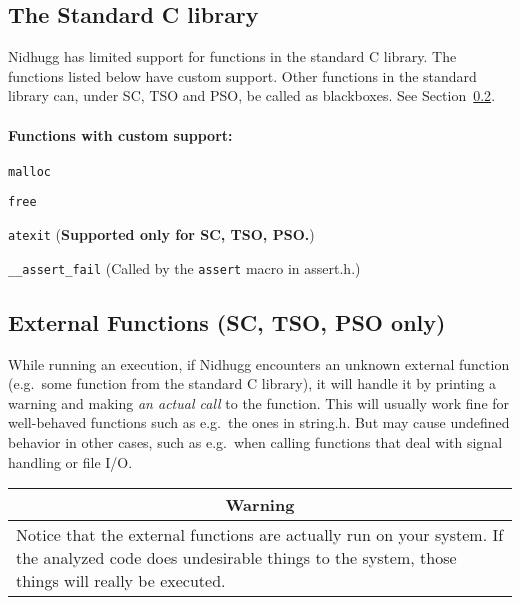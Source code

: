 \documentclass[a4paper]{article}
\newcommand{\limitsupport}[1]{\textbf{Supported only for #1.}}
\begin{document}
\subsection{The Standard C library}\label{sec:stdlibc}

Nidhugg has limited support for functions in the standard C
library. The functions listed below have custom support. Other
functions in the standard library can, under SC, TSO and PSO, be
called as blackboxes. See Section~\ref{sec:external:functions}.

\paragraph{Functions with custom support:}

\begin{description}
\item{\texttt{malloc}}
\item{\texttt{free}}
\item{\texttt{atexit}} (\limitsupport{SC, TSO, PSO})
\item{\texttt{\_\_assert\_fail}} (Called by the \texttt{assert} macro
  in \textsf{assert.h}.)
\end{description}

\subsection{External Functions (SC, TSO, PSO only)}\label{sec:external:functions}

While running an execution, if Nidhugg encounters an unknown external
function (e.g.\ some function from the standard C library), it will
handle it by printing a warning and making \emph{an actual call} to
the function. This will usually work fine for well-behaved functions
such as e.g.\ the ones in \textsf{string.h}. But may cause undefined
behavior in other cases, such as e.g.\ when calling functions that deal
with signal handling or file I/O.

\begin{center}
  \begin{tabular}{|p{.8\linewidth}|}
    \hline
    \multicolumn{1}{|c|}{\textbf{Warning}}\\
    \hline
    Notice that the external functions are actually run on your system. If
    the analyzed code does undesirable things to the system, those things
    will really be executed.\\
    \hline
  \end{tabular}
\end{center}
\end{document}
